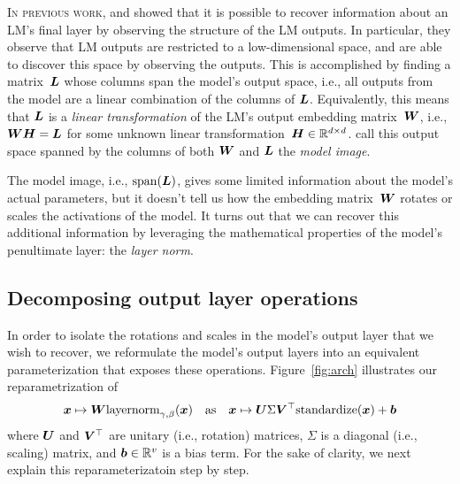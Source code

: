 \documentclass{article}
\newcommand\layernorm{\mathrm{layernorm}}
\newcommand\standardize{\mathrm{standardize}}
\newcommand\linalgspan{\mathrm{span}}
\begin{document}
\lettrine{I}{n previous work,} \citet{Finlayson2024LogitsOA} and \citet{Carlini2024StealingPO} showed that it is possible to recover information about an LM's final layer by observing the structure of the LM outputs.
In particular, they observe that LM outputs are restricted to a low-dimensional space, and are able to discover this space by observing the outputs.
This is accomplished by finding a matrix~\({\bm{L}}\) whose columns span the model's output space, i.e., all outputs from the model are a linear combination of the columns of \({\bm{L}}\).
Equivalently, this means that \({\bm{L}}\) is a \emph{linear transformation} of the LM's output embedding matrix~\({\bm{W}}\),
i.e., \({\bm{W}}{\bm{H}}={\bm{L}}\) for some unknown linear transformation~\({\bm{H}}\in\mathbb{R}^{d\times d}\).
\citeauthor{Finlayson2024LogitsOA} call this output space spanned by the columns of both \({\bm{W}}\) and \({\bm{L}}\) the \textit{model image}. 

The model image, i.e., \(\linalgspan(\mL)\),
gives some limited information about the model's actual parameters,
but it doesn't tell us how the embedding matrix~\({\bm{W}}\) 
rotates or scales the activations of the model.
It turns out that we can recover this additional information by leveraging the mathematical properties of the model's penultimate layer: the \textit{layer norm}.

\subsection{Decomposing output layer operations}

In order to isolate the rotations and scales in the model's output layer 
that we wish to recover,
we reformulate the model's output layers into an equivalent parameterization
that exposes these operations.
Figure~\ref{fig:arch} illustrates our reparametrization of 
\[\vx\mapsto\mW\layernorm_{\gamma,\beta}(\vx) \quad
\text{as} \quad \vx\mapsto\mU\Sigma\mV^\top\standardize(\vx)+\vb\]
where \({\bm{U}}\) and \({\bm{V}}^\top\) are unitary (i.e., rotation) matrices, 
\(\Sigma\) is a diagonal (i.e., scaling) matrix, and \({\bm{b}}\in\mathbb{R}^v\) is a bias term.
For the sake of clarity, we next explain this reparameterizatoin step by step.
\end{document}
